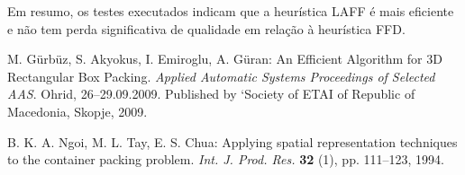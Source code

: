 \documentclass[12pt]{article}
\begin{document}
Em resumo, os testes executados indicam que a heurística LAFF é mais eficiente e não tem perda significativa de qualidade em relação à heurística FFD.

\begin{thebibliography}{99}

	 M. G\"{u}rb\"{u}z, S. Akyokus, I. Emiroglu, A. G\"{u}ran: An Efficient Algorithm for 3D Rectangular Box Packing. \emph{Applied Automatic Systems Proceedings of Selected AAS}. Ohrid, 26--29.09.2009. Published by `Society of ETAI of Republic of Macedonia, Skopje, 2009.

	 B. K. A. Ngoi, M. L. Tay, E. S. Chua: Applying spatial representation techniques to the container packing problem. \emph{Int. J. Prod. Res.} \textbf{32} (1), pp. 111--123, 1994.

\end{thebibliography}
\end{document}
